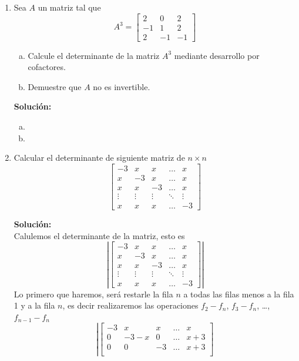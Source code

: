 \documentclass[12pt]{article}
\newenvironment{solucion}
{\begin{mdframed}[backgroundcolor=black!10]
		{\bf Solución:}\\
	}
	{
	\end{mdframed}
}
\newenvironment{preguntas}
{\begin{enumerate}\itemsep12pt
	}
	{
	\end{enumerate}
}
\begin{document}
\begin{preguntas}
\item Sea $A$ un matriz tal que
$$A^3 = 
\begin{bmatrix}
2 & 0 & 2\\
-1 & 1 & 2\\
2 & -1 & -1
\end{bmatrix}$$
\begin{enumerate}[a)]
\item Calcule el determinante de la matriz $A^3$ mediante desarrollo por cofactores.
\item Demuestre que $A$ no es invertible.
\end{enumerate}
\begin{solucion}

\begin{enumerate}[a)]
\item 
\item 
\end{enumerate}
\end{solucion}
\item Calcular el determinante de siguiente matriz de $n\times n$
	$$ \begin{bmatrix}
	-3 & x & x & \dots & x \\
	x & -3 & x & \dots & x \\
	x & x & -3 & \dots & x \\
	\vdots & \vdots & \vdots & \ddots & \vdots \\
	x & x & x & \dots & -3
	\end{bmatrix}$$
\begin{solucion}
Calulemos el determinante de la matriz, esto es
		$$ \left|\begin{bmatrix}
		-3 & x & x & \dots & x \\
		x & -3 & x & \dots & x \\
		x & x & -3 & \dots & x \\
		\vdots & \vdots & \vdots & \ddots & \vdots \\
		x & x & x & \dots & -3
		\end{bmatrix}\right|$$
		Lo primero que haremos, será restarle la fila $n$ a todas las filas menos a la fila 1 y a la fila $n$, es decir realizaremos las operaciones $f_2-f_n$, $f_3-f_n$, \dots, $f_{n-1} - f_n$
		$$ \left|\begin{bmatrix}
		-3 & x & x & \dots & x \\
		0 & -3-x & 0 & \dots & x+3 \\
		0 & 0 & -3 & \dots & x+3 \\

\end{bmatrix}$$
\end{solucion}
\end{preguntas}
\end{document}
